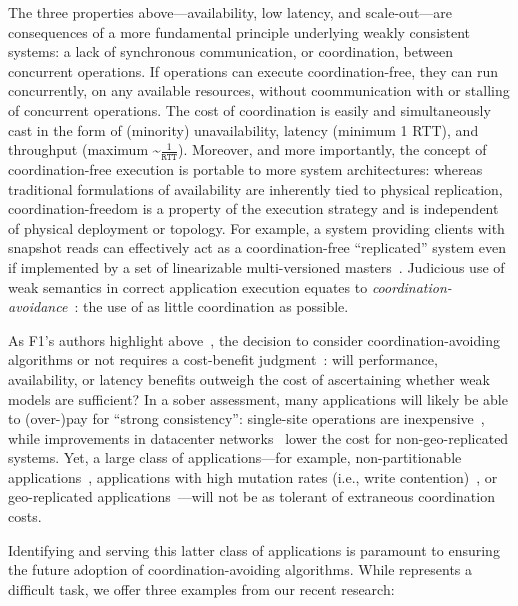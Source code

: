 \documentclass[9pt]{article}
\begin{document}
The three properties above---availability, low latency, and scale-out---are consequences of a more fundamental principle underlying weakly consistent systems: a lack of synchronous communication, or coordination, between concurrent operations. If operations can execute coordination-free, they can run concurrently, on any available resources, without coommunication with or stalling of concurrent operations. The cost of coordination is easily and simultaneously cast in the form of (minority) unavailability, latency (minimum 1 RTT), and throughput (maximum \textasciitilde$\frac{1}{\texttt{RTT}}$). Moreover, and more importantly, the concept of coordination-free execution is portable to more system architectures: whereas traditional formulations of availability are inherently tied to physical replication, coordination-freedom is a property of the execution strategy and is independent of physical deployment or topology. For example, a system providing clients with snapshot reads can effectively act as a coordination-free ``replicated'' system even if implemented by a set of linearizable multi-versioned masters~\cite{ramp-txns}. Judicious use of weak semantics in correct application execution equates to \textit{coordination-avoidance}~\cite{coord-avoid}: the use of as little coordination as possible.

 As F1's authors highlight above~\cite{f1}, the decision to consider coordination-avoiding algorithms or not requires a cost-benefit judgment~\cite{queue}: will performance, availability, or latency benefits outweigh the cost of ascertaining whether weak models are sufficient? In a sober assessment, many applications will likely be able to (over-)pay for ``strong consistency'': single-site operations are inexpensive~\cite{sharednothing}, while improvements in datacenter networks~\cite{bobtail} lower the cost for non-geo-replicated systems. Yet, a large class of applications---for example, non-partitionable applications~\cite{tao}, applications with high mutation rates (i.e., write contention)~\cite{tpcc}, or geo-replicated applications~\cite{swift}---will not be as tolerant of extraneous coordination costs.

Identifying and serving this latter class of applications is paramount to ensuring the future adoption of coordination-avoiding algorithms. While represents a difficult task, we offer three examples from our recent research:
\end{document}

